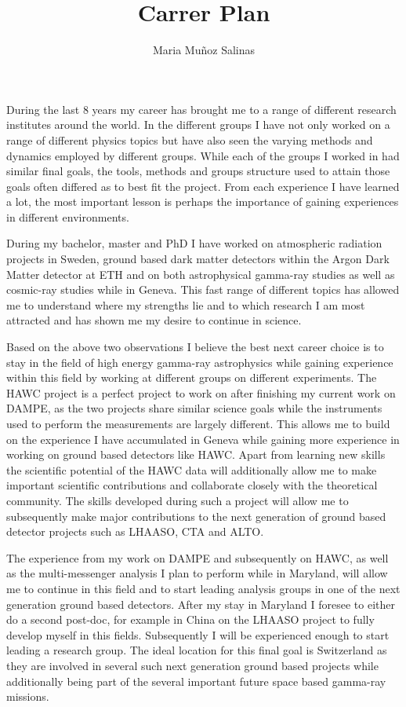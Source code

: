 \documentclass[10pt]{article}
\title{Carrer Plan}
\author{Maria Mu\~noz Salinas}
\date{\vspace{-5ex}}
\begin{document}
\maketitle

During the last 8 years my career has brought me to a range of different research institutes around the world. In the different groups I have not only worked on a range of different physics topics but have also seen the varying methods and dynamics employed by different groups. While each of the groups I worked in had similar final goals, the tools, methods and groups structure used to attain those goals often differed as to best fit the project. From each experience I have learned a lot, the most important lesson is perhaps the importance of gaining experiences in different environments. 

During my bachelor, master and PhD I have worked on atmospheric radiation projects in Sweden, ground based dark matter detectors within the Argon Dark Matter detector at ETH and on both astrophysical gamma-ray studies as well as cosmic-ray studies while in Geneva. This fast range of different topics has allowed me to understand where my strengths lie and to which research I am most attracted and has shown me my desire to continue in science.

Based on the above two observations I believe the best next career choice is to stay in the field of high energy gamma-ray astrophysics while gaining experience within this field by working at different groups on different experiments. The HAWC project is a perfect project to work on after finishing my current work on DAMPE, as the two projects share similar science goals while the instruments used to perform the measurements are largely different. This allows me to build on the experience I have accumulated in Geneva while gaining more experience in working on ground based detectors like HAWC. Apart from learning new skills the scientific potential of the HAWC data will additionally allow me to make important scientific contributions and collaborate closely with the theoretical community. The skills developed during such a project will allow me to subsequently make major contributions to the next generation of ground based detector projects such as LHAASO, CTA and ALTO. 

The experience from my work on DAMPE and subsequently on HAWC, as well as the multi-messenger analysis I plan to perform while in Maryland, will allow me to continue in this field and to start leading analysis groups in one of the next generation ground based detectors. After my stay in Maryland I foresee to either do a second post-doc, for example in China on the LHAASO project to fully develop myself in this fields. Subsequently I will be experienced enough to start leading a research group. The ideal location for this final goal is Switzerland as they are involved in several such next generation ground based projects while additionally being part of the several important future space based gamma-ray missions. 
\end{document}
